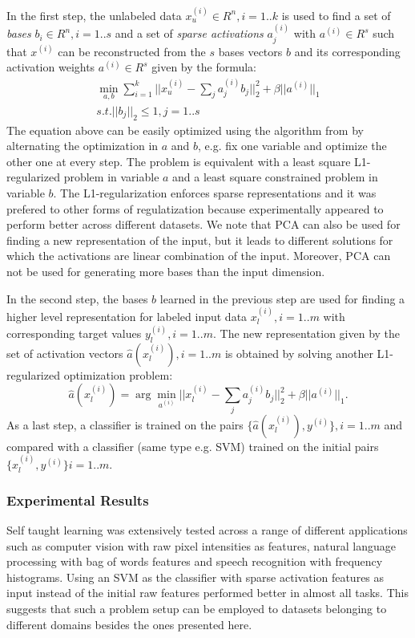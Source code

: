 \documentclass[10pt,journal,a4paper]{IEEEtran}
\begin{document}
In the first step, the unlabeled data $x^{(i)}_u \in R^n, i=1..k$ is used to find a set of \textit{bases} $b_i \in R^n, i=1..s$ and a set of \textit{sparse activations} $a_j^{(i)}$ with $a^{(i)}\in R^s$ such that $x^{(i)}$ can
be reconstructed from the $s$ bases vectors $b$ and its corresponding activation weights $a^{(i)} \in R^s$ given by the formula:
\begin{equation}
\begin{array}{c }
	\min_{a,b} \sum_{i=1}^k ||x_u^{(i)} - \sum_j a_j^{(i)} b_j||_2^2 + \beta||a^{(i)}||_1    \\
	 s.t. ||b_j||_2 \leq 1, j=1..s
	\end{array}
\end{equation}
The equation above can be easily optimized using the algorithm from \cite{sparsetraining} by alternating the optimization in $a$ and $b$, e.g. fix one variable and optimize the other one at every step.
The problem is equivalent with a least square L1-regularized problem in variable $a$ and a least square constrained problem in  variable $b$. The L1-regularization enforces sparse representations and it was prefered to other forms of regulatization because experimentally appeared to perform better across different datasets. We note that PCA can also be used for finding a new representation of the input, but it leads to different solutions for which the activations are linear combination of the input. Moreover,  PCA can not be used for generating more bases than the input dimension.


In the second step, the bases $b$ learned in the previous step are used for finding a higher level representation for labeled input data $x_l^{(i)}, i=1..m$ with corresponding target values $y_l^{(i)}, i=1..m$. The new representation given by the set of activation vectors $\hat{a}(x_l^{(i)}), i=1..m$ is obtained by solving another L1- regularized optimization problem:
\begin{equation}
\hat{a}(x_l^{(i)}) = \arg\min_{a^{(i)}}|| x_l^{(i)} - \sum_j a_j^{(i)}b_j||_2^2 + \beta||a^{(i)}||_1.
\end{equation}
As a last step, a classifier is trained on the pairs $\{\hat{a}(x_l^{(i)}), y^{(i)}\} , i=1..m$ and compared with a classifier (same type e.g. SVM) trained on the initial pairs $\{x_l^{(i)}, y^{(i)}\} i=1..m$.


\subsubsection{Experimental Results}
Self taught learning was extensively tested across a range of different applications such as computer vision with raw pixel intensities as features, natural language processing with bag of words features and speech recognition with frequency histograms. Using an SVM as the classifier with sparse activation features as input instead of the initial raw features performed better in almost all tasks. This suggests that such a problem setup can be employed to datasets belonging to different domains besides the ones presented here.
\end{document}
